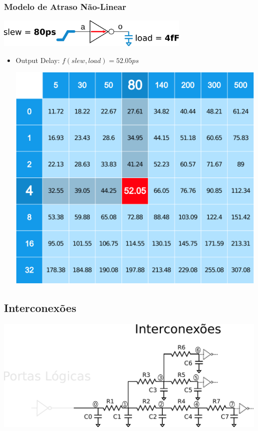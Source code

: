 \documentclass[10pt,a4paper]{beamer}
\begin{document}
			\begin{frame}
				\frametitle{Modelo de Atraso Não-Linear}
					\begin{center}
						\includegraphics[width=0.7\textwidth]{img/nldm_1.pdf}
					\end{center} \pause
					
					\begin{itemize}
						\item Output Delay: $f(slew, load) = 52.05ps $	\\
						\begin{center}
							\includegraphics[width=0.4 \linewidth]{img/nldm_2.pdf} 
						\end{center}
					\end{itemize}					
						
			\end{frame}
		
		\subsection*{Interconexões}

			
			\begin{frame}
				\includegraphics[width=\textwidth]{img/circuito_interconexao.pdf} 
			\end{frame}
			
\end{document}
